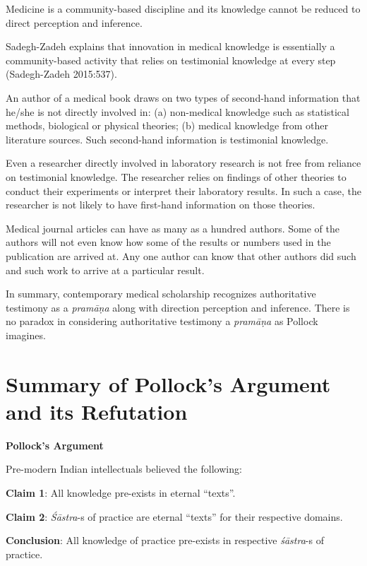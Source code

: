 \newpage

Medicine is a community-based discipline and its knowledge cannot be reduced to direct perception and inference. 

Sadegh-Zadeh explains that innovation in medical knowledge is essentially a community-based activity that relies on testimonial knowledge at every step (Sadegh-Zadeh 2015:537).

An author of a medical book draws on two types of second-hand information that he/she is not directly involved in: (a) non-medical knowledge such as statistical methods, biological or physical theories; (b) medical knowledge from other literature sources.  Such second-hand information is testimonial knowledge.

Even a researcher directly involved in laboratory research is not free from reliance on testimonial knowledge. The researcher relies on findings of other theories to conduct their experiments or interpret their laboratory results. In such a case, the researcher is not likely to have first-hand information on those theories.

Medical journal articles can have as many as a hundred authors. Some of the authors will not even know how some of the results or numbers used in the publication are arrived at. Any one author can know that other authors did such and such work to arrive at a particular result.

In summary, contemporary medical scholarship recognizes authoritative testimony as a {\sl pramāṇa} along with direction perception and inference. There is no paradox in considering authoritative testimony a {\sl pramāṇa} as Pollock imagines.

\section*{Summary of Pollock's Argument and its Refutation}

{\bf Pollock's Argument}

Pre-modern Indian intellectuals believed the following:

{\bf Claim 1}: All knowledge pre-exists in eternal ``texts''.  

{\bf Claim 2}: {\sl Śāstra}-s of practice are eternal ``texts'' for their respective domains.

{\bf Conclusion}:  All knowledge of practice pre-exists in respective {\sl śāstra}-s of practice. 

\newpage

